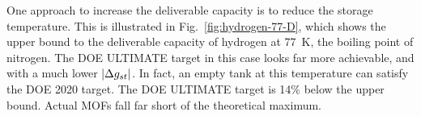 One approach to increase the deliverable capacity is to reduce the storage temperature. This is illustrated in Fig.~\ref{fig:hydrogen-77-D}, which shows the upper bound to the deliverable capacity of hydrogen at 77\ K, the boiling point of nitrogen. The DOE ULTIMATE target in this case looks far more achievable, and with a much lower $|\Delta g_{st}|$. In fact, an empty tank at this temperature can satisfy the DOE 2020 target. The DOE ULTIMATE target is 14\% below the upper bound. Actual MOFs fall far short of the theoretical maximum.  